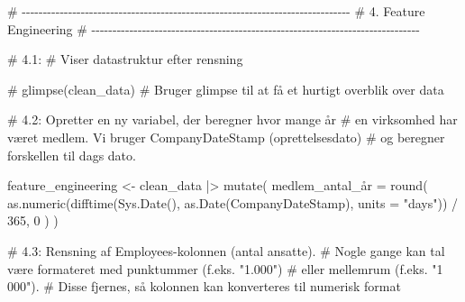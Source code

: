\documentclass[
  11pt,
  letterpaper,
  DIV=11,
  numbers=noendperiod]{scrartcl}
\newenvironment{Shaded}{\begin{snugshade}}{\end{snugshade}}
\newcommand{\AttributeTok}[1]{\textcolor[rgb]{0.40,0.45,0.13}{#1}}
\newcommand{\CommentTok}[1]{\textcolor[rgb]{0.37,0.37,0.37}{#1}}
\newcommand{\DecValTok}[1]{\textcolor[rgb]{0.68,0.00,0.00}{#1}}
\newcommand{\FunctionTok}[1]{\textcolor[rgb]{0.28,0.35,0.67}{#1}}
\newcommand{\NormalTok}[1]{\textcolor[rgb]{0.00,0.23,0.31}{#1}}
\newcommand{\OtherTok}[1]{\textcolor[rgb]{0.00,0.23,0.31}{#1}}
\newcommand{\SpecialCharTok}[1]{\textcolor[rgb]{0.37,0.37,0.37}{#1}}
\newcommand{\StringTok}[1]{\textcolor[rgb]{0.13,0.47,0.30}{#1}}
\begin{document}
\begin{Shaded}
\end{Shaded}

\begin{Shaded}
\begin{Highlighting}[]
\CommentTok{\# {-}{-}{-}{-}{-}{-}{-}{-}{-}{-}{-}{-}{-}{-}{-}{-}{-}{-}{-}{-}{-}{-}{-}{-}{-}{-}{-}{-}{-}{-}{-}{-}{-}{-}{-}{-}{-}{-}{-}{-}{-}{-}{-}{-}{-}{-}{-}{-}{-}{-}{-}{-}{-}{-}{-}{-}{-}{-}{-}{-}{-}{-}{-}{-}{-}{-}{-}{-}{-}{-}{-}{-}{-}{-}{-}{-}{-}{-}}
\CommentTok{\# 4. Feature Engineering}
\CommentTok{\# {-}{-}{-}{-}{-}{-}{-}{-}{-}{-}{-}{-}{-}{-}{-}{-}{-}{-}{-}{-}{-}{-}{-}{-}{-}{-}{-}{-}{-}{-}{-}{-}{-}{-}{-}{-}{-}{-}{-}{-}{-}{-}{-}{-}{-}{-}{-}{-}{-}{-}{-}{-}{-}{-}{-}{-}{-}{-}{-}{-}{-}{-}{-}{-}{-}{-}{-}{-}{-}{-}{-}{-}{-}{-}{-}{-}{-}{-}}

\CommentTok{\# 4.1: \# Viser datastruktur efter rensning}


\CommentTok{\# glimpse(clean\_data) \# Bruger glimpse til at få et hurtigt overblik over data}


\CommentTok{\# 4.2: Opretter en ny variabel, der beregner hvor mange år }
\CommentTok{\# en virksomhed har været medlem. Vi bruger CompanyDateStamp (oprettelsesdato)}
\CommentTok{\# og beregner forskellen til dags dato.}

\NormalTok{feature\_engineering }\OtherTok{\textless{}{-}}\NormalTok{ clean\_data }\SpecialCharTok{|\textgreater{}}
  \FunctionTok{mutate}\NormalTok{(}
\NormalTok{    medlem\_antal\_å}\AttributeTok{r =} \FunctionTok{round}\NormalTok{(}
      \FunctionTok{as.numeric}\NormalTok{(}\FunctionTok{difftime}\NormalTok{(}\FunctionTok{Sys.Date}\NormalTok{(), }\FunctionTok{as.Date}\NormalTok{(CompanyDateStamp), }
                          \AttributeTok{units =} \StringTok{"days"}\NormalTok{)) }\SpecialCharTok{/} \DecValTok{365}\NormalTok{, }
      \DecValTok{0}
\NormalTok{    )}
\NormalTok{  )}
  

\CommentTok{\# 4.3: Rensning af Employees{-}kolonnen (antal ansatte). }
\CommentTok{\# Nogle gange kan tal være formateret med punktummer (f.eks. "1.000") }
\CommentTok{\# eller mellemrum (f.eks. "1 000"). }
\CommentTok{\# Disse fjernes, så kolonnen kan konverteres til numerisk format}


\end{Highlighting}
\end{Shaded}
\end{document}
